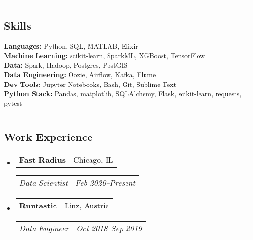 \documentclass[10pt,letterpaper]{article}
\makeatletter
\newenvironment{indentsection}[1]%
{\begin{list}{}%
	{\setlength{\leftmargin}{#1}}%
	\item[]%
}
{\end{list}}
\newcommand{\headerrow}[2]
	{\begin{tabular*}{\linewidth}{l@{\extracolsep{\fill}}r}
	#1 & #2 
	 \end{tabular*}}
\newcommand{\jobitem}[4]{
	\item \headerrow{\textbf{#1}}{#2}
	\headerrow{\emph{#3}}{\emph{#4}}
}
\makeatother
\begin{document}
\hrule
\subsection*{Skills}
	\begin{indentsection}{\parindent}
		\textbf{Languages:} Python, SQL, MATLAB, Elixir \\
		\textbf{Machine Learning:} scikit-learn, SparkML, XGBoost, TensorFlow \\	
		\textbf{Data:} Spark, Hadoop, Postgres, PostGIS \\
		\textbf{Data Engineering:} Oozie, Airflow, Kafka, Flume  \\  
		\textbf{Dev Tools:} Jupyter Notebooks, Bash, Git,  Sublime Text \\  
		\textbf{Python Stack:} Pandas, matplotlib, SQLAlchemy, Flask, scikit-learn, requests, pytest
	\end{indentsection}

\hrule
\subsection*{Work Experience}
\begin{itemize}
	\jobitem{Fast Radius}{Chicago, IL}
		     {Data Scientist}{Feb 2020--Present}
\end{itemize}


\begin{itemize}
	\jobitem{Runtastic}		{Linz, Austria}
		    {Data Engineer}	{Oct 2018--Sep 2019}
\end{itemize}
\end{document}
